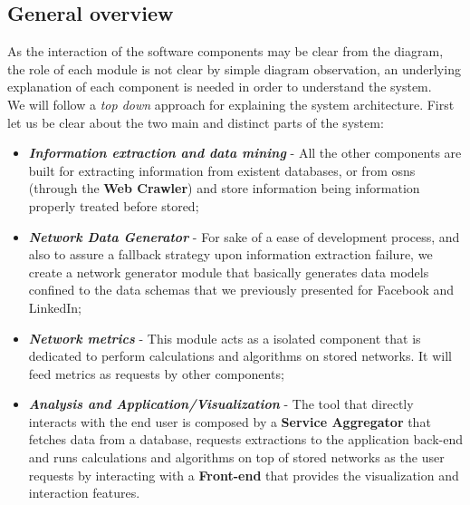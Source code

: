 \subsection{General overview}
As the interaction of the software components may be clear from the diagram, the role of each module is not clear by simple
diagram observation, an underlying explanation of each component is needed in order to understand the system.\\
\indent We will follow a \textit{top down} approach for explaining the system architecture. First let us be clear about the two
main and distinct parts of the system:
\begin{itemize}
    \item \textbf{\textit{Information extraction and data mining}} - All the other components are built for extracting information
    from existent databases, or from \glspl{osn} (through the \textbf{Web Crawler}) and store information being information properly treated before stored;
    \item \textbf{\textit{Network Data Generator}} - For sake of a ease of development process, and also to assure a fallback strategy upon information extraction failure, we create a network generator module that basically generates data models confined to the data schemas that we previously presented for Facebook and LinkedIn;
    \item \textbf{\textit{Network metrics}} - This module acts as a isolated component that is dedicated to perform calculations and algorithms on stored networks. It will feed metrics as requests by other components;
    \item \textbf{\textit{Analysis and Application/Visualization}} - The tool that directly interacts with the end user is composed by a \textbf{Service Aggregator} that fetches data from a database, requests extractions to the application back-end and runs calculations and algorithms on top of stored networks as the user requests by interacting with a \textbf{Front-end} that provides the visualization and interaction features.
\end{itemize}

